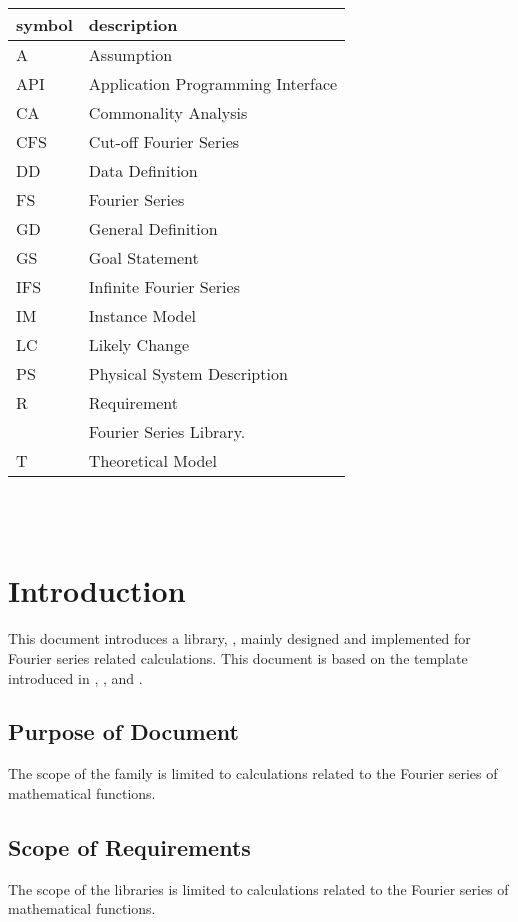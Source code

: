 \documentclass[12pt]{article}
\begin{document}
\renewcommand{\arraystretch}{1.2}
\begin{tabular}{l l} 
	\toprule		
	\textbf{symbol} & \textbf{description}\\
	\midrule 
	A & Assumption\\
	API & Application Programming Interface\\
	CA & Commonality Analysis\\
	CFS & Cut-off Fourier Series\\
	DD & Data Definition\\
	FS & Fourier Series\\
	GD & General Definition\\
	GS & Goal Statement\\
	IFS & Infinite Fourier Series\\
	IM & Instance Model\\
	LC & Likely Change\\
	PS & Physical System Description\\
	R & Requirement\\
	\progname{} & Fourier Series Library.\\
	T & Theoretical Model\\
	\bottomrule
\end{tabular}\\

~\newpage



\section{Introduction}
This document introduces a library, \progname, mainly designed and implemented 
for Fourier series related calculations. This document is based on the 
template introduced in \cite{Smith2006}, \cite{SmithAndLai2005}, 
and \cite{SmithMcCutchanAndCarette2017}.


\subsection{Purpose of Document}

The scope of the family is limited to calculations related to the Fourier 
series of mathematical functions.

\subsection{Scope of Requirements} 

The scope of the libraries is limited to calculations related to the Fourier 
series of mathematical functions.
\end{document}
